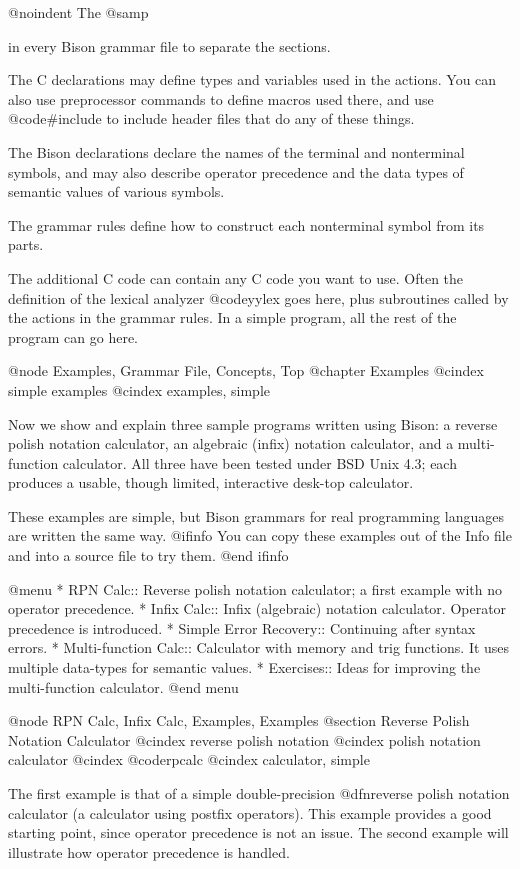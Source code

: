 @noindent
The @samp{%
in every Bison grammar file to separate the sections.

The C declarations may define types and variables used in the actions.
You can also use preprocessor commands to define macros used there, and use
@code{#include} to include header files that do any of these things.

The Bison declarations declare the names of the terminal and nonterminal
symbols, and may also describe operator precedence and the data types of
semantic values of various symbols.

The grammar rules define how to construct each nonterminal symbol from its
parts.

The additional C code can contain any C code you want to use.  Often the
definition of the lexical analyzer @code{yylex} goes here, plus subroutines
called by the actions in the grammar rules.  In a simple program, all the
rest of the program can go here.

@node Examples, Grammar File, Concepts, Top
@chapter Examples
@cindex simple examples
@cindex examples, simple

Now we show and explain three sample programs written using Bison: a
reverse polish notation calculator, an algebraic (infix) notation
calculator, and a multi-function calculator.  All three have been tested
under BSD Unix 4.3; each produces a usable, though limited, interactive
desk-top calculator.

These examples are simple, but Bison grammars for real programming
languages are written the same way.
@ifinfo
You can copy these examples out of the Info file and into a source file
to try them.
@end ifinfo

@menu
* RPN Calc::               Reverse polish notation calculator;
			     a first example with no operator precedence.
* Infix Calc::		   Infix (algebraic) notation calculator.
			     Operator precedence is introduced.
* Simple Error Recovery::  Continuing after syntax errors.
* Multi-function Calc::    Calculator with memory and trig functions.
			     It uses multiple data-types for semantic values.
* Exercises::		   Ideas for improving the multi-function calculator.
@end menu

@node RPN Calc, Infix Calc, Examples, Examples
@section Reverse Polish Notation Calculator
@cindex reverse polish notation
@cindex polish notation calculator
@cindex @code{rpcalc}
@cindex calculator, simple

The first example is that of a simple double-precision @dfn{reverse polish
notation} calculator (a calculator using postfix operators).  This example
provides a good starting point, since operator precedence is not an issue.
The second example will illustrate how operator precedence is handled.

}
